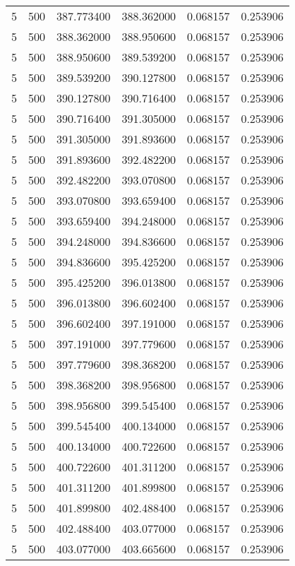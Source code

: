 \begin{longtable}{rrrrrr}
5 & 500 & 387.773400 & 388.362000 & 0.068157 & 0.253906 \\
5 & 500 & 388.362000 & 388.950600 & 0.068157 & 0.253906 \\
5 & 500 & 388.950600 & 389.539200 & 0.068157 & 0.253906 \\
5 & 500 & 389.539200 & 390.127800 & 0.068157 & 0.253906 \\
5 & 500 & 390.127800 & 390.716400 & 0.068157 & 0.253906 \\
5 & 500 & 390.716400 & 391.305000 & 0.068157 & 0.253906 \\
5 & 500 & 391.305000 & 391.893600 & 0.068157 & 0.253906 \\
5 & 500 & 391.893600 & 392.482200 & 0.068157 & 0.253906 \\
5 & 500 & 392.482200 & 393.070800 & 0.068157 & 0.253906 \\
5 & 500 & 393.070800 & 393.659400 & 0.068157 & 0.253906 \\
5 & 500 & 393.659400 & 394.248000 & 0.068157 & 0.253906 \\
5 & 500 & 394.248000 & 394.836600 & 0.068157 & 0.253906 \\
5 & 500 & 394.836600 & 395.425200 & 0.068157 & 0.253906 \\
5 & 500 & 395.425200 & 396.013800 & 0.068157 & 0.253906 \\
5 & 500 & 396.013800 & 396.602400 & 0.068157 & 0.253906 \\
5 & 500 & 396.602400 & 397.191000 & 0.068157 & 0.253906 \\
5 & 500 & 397.191000 & 397.779600 & 0.068157 & 0.253906 \\
5 & 500 & 397.779600 & 398.368200 & 0.068157 & 0.253906 \\
5 & 500 & 398.368200 & 398.956800 & 0.068157 & 0.253906 \\
5 & 500 & 398.956800 & 399.545400 & 0.068157 & 0.253906 \\
5 & 500 & 399.545400 & 400.134000 & 0.068157 & 0.253906 \\
5 & 500 & 400.134000 & 400.722600 & 0.068157 & 0.253906 \\
5 & 500 & 400.722600 & 401.311200 & 0.068157 & 0.253906 \\
5 & 500 & 401.311200 & 401.899800 & 0.068157 & 0.253906 \\
5 & 500 & 401.899800 & 402.488400 & 0.068157 & 0.253906 \\
5 & 500 & 402.488400 & 403.077000 & 0.068157 & 0.253906 \\
5 & 500 & 403.077000 & 403.665600 & 0.068157 & 0.253906 \\

\end{longtable}
